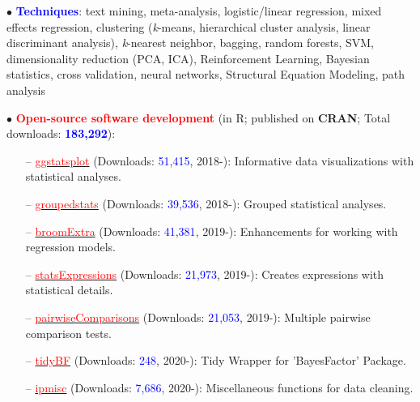 \documentclass[10pt]{article}
\begin{document}
	$\bullet$ \textcolor{blue}{\textbf{Techniques}}: text mining, meta-analysis, logistic/linear regression, mixed effects regression, clustering \hspace*{0.1in}(\textit{k}-means, hierarchical cluster analysis, linear discriminant analysis), \textit{k}-nearest neighbor, bagging, random \hspace*{0.1in}forests, SVM, dimensionality reduction (PCA, ICA), Reinforcement Learning, Bayesian statistics, cross \hspace*{0.1in}validation, neural networks, Structural Equation Modeling, path analysis
	\miniskip
	
	$\bullet$ \textcolor{red}{\textbf{Open-source software development}} (in R; published on \textbf{CRAN}; Total downloads: \textcolor{blue}{\textbf{183,292}}):
	 \vspace*{-0.09in}
	 
	\begin{itemize}
	\itemsep-0.1em
	\item[--] \href{https://indrajeetpatil.github.io/ggstatsplot/}{\textcolor{red}{ggstatsplot}} (Downloads: \textcolor{blue}{51,415}, 2018-): Informative data visualizations with statistical analyses.
	\item[--] \href{https://indrajeetpatil.github.io/groupedstats/}{\textcolor{red}{groupedstats}} (Downloads: \textcolor{blue}{39,536}, 2018-): Grouped statistical analyses.
	\item[--] \href{https://indrajeetpatil.github.io/groupedstats/}{\textcolor{red}{broomExtra}} (Downloads: \textcolor{blue}{41,381}, 2019-): Enhancements for working with regression models.
	\item[--] \href{https://indrajeetpatil.github.io/statsExpressions/}{\textcolor{red}{statsExpressions}} (Downloads: \textcolor{blue}{21,973}, 2019-): Creates expressions with statistical details.
	\item[--] \href{https://indrajeetpatil.github.io/pairwiseComparisons/}{\textcolor{red}{pairwiseComparisons}} (Downloads: \textcolor{blue}{21,053}, 2019-): Multiple pairwise comparison tests.
    \item[--] \href{https://indrajeetpatil.github.io/tidyBF/}{\textcolor{red}{tidyBF}} (Downloads: \textcolor{blue}{248}, 2020-): Tidy Wrapper for 'BayesFactor' Package.
	\item[--] \href{https://indrajeetpatil.github.io/ipmisc/}{\textcolor{red}{ipmisc}} (Downloads: \textcolor{blue}{7,686}, 2020-): Miscellaneous functions for data cleaning.	
	\end{itemize}
	
\end{document}
